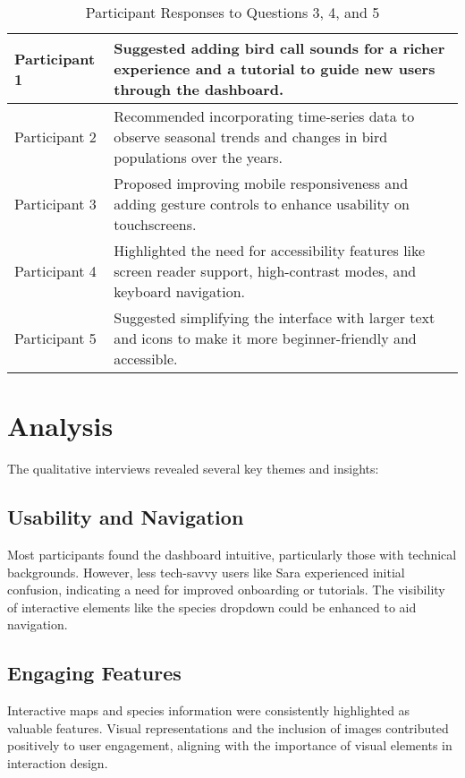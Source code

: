 \begin{table}[H]
\begin{tabular}{p{3cm} | p{12cm}}
        \hline
        Participant 1 & Suggested adding bird call sounds for a richer experience and a tutorial to guide new users through the dashboard. \\
        \hline
        Participant 2 & Recommended incorporating time-series data to observe seasonal trends and changes in bird populations over the years. \\
        \hline
        Participant 3 & Proposed improving mobile responsiveness and adding gesture controls to enhance usability on touchscreens. \\
        \hline
        Participant 4 & Highlighted the need for accessibility features like screen reader support, high-contrast modes, and keyboard navigation. \\
        \hline
        Participant 5 & Suggested simplifying the interface with larger text and icons to make it more beginner-friendly and accessible. \\
        \hline
    \end{tabular}
    \caption{Participant Responses to Questions 3, 4, and 5}
    \label{tab:responses2}
\end{table}


\section{Analysis}

The qualitative interviews revealed several key themes and insights:

\subsection{Usability and Navigation}

Most participants found the dashboard intuitive, particularly those with technical backgrounds. However, less tech-savvy users like Sara experienced initial confusion, indicating a need for improved onboarding or tutorials. The visibility of interactive elements like the species dropdown could be enhanced to aid navigation.

\subsection{Engaging Features}

Interactive maps and species information were consistently highlighted as valuable features. Visual representations and the inclusion of images contributed positively to user engagement, aligning with the importance of visual elements in interaction design.

